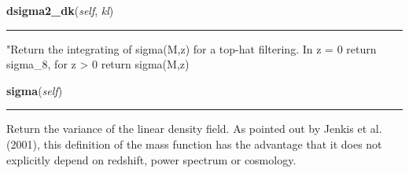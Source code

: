    \label{pycosmicstar:cosmology:cosmology:dsigma2_dk}

    \vspace{0.5ex}

\hspace{.8\funcindent}\begin{boxedminipage}{\funcwidth}

    \raggedright \textbf{dsigma2\_dk}(\textit{self}, \textit{kl})

    \vspace{-1.5ex}

    \rule{\textwidth}{0.5\fboxrule}
\setlength{\parskip}{2ex}
    "Return the integrating of sigma(M,z) for a top-hat filtering. In z = 0
    return sigma\_8, for z {\textgreater} 0 return sigma(M,z)

\setlength{\parskip}{1ex}
    \end{boxedminipage}

    \label{pycosmicstar:cosmology:cosmology:sigma}

    \vspace{0.5ex}

\hspace{.8\funcindent}\begin{boxedminipage}{\funcwidth}

    \raggedright \textbf{sigma}(\textit{self})

    \vspace{-1.5ex}

    \rule{\textwidth}{0.5\fboxrule}
\setlength{\parskip}{2ex}
    Return  the variance of the linear density field. As pointed out by 
    Jenkis et al. (2001), this definition of the mass function has the 
    advantage that it does not explicitly depend on redshift, power 
    spectrum or cosmology.

\setlength{\parskip}{1ex}
    \end{boxedminipage}

    \label{pycosmicstar:cosmology:cosmology:age}

